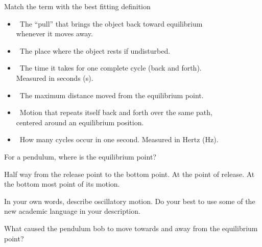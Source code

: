 \documentclass[]{exam}
\begin{document}
\begin{questions}
\question
Match the term with the best fitting definition

\begin{EnvUplevel}
\centering
{}%
\begin{minipage}{11.5cm}
\centering
\begin{itemize}
    \item[] \fillin[C][5mm]\ The ``pull'' that brings the object back toward equilibrium\\whenever it moves away.
    \item[] \fillin[B][5mm]\ The place where the object rests if undisturbed.
    \item[] \fillin[D][5mm]\ The time it takes for one complete cycle (back and forth).\\Measured in seconds (s).
    \item[] \fillin[F][5mm]\ The maximum distance moved from the equilibrium point.
    \item[] \fillin[A][5mm]\ Motion that repeats itself back and forth over the same path,\\centered around an equilibrium position.
    \item[] \fillin[E][5mm]\ How many cycles occur in one second. Measured in Hertz (Hz).
\end{itemize}
\end{minipage}
\end{EnvUplevel}



\question
For a pendulum, where is the equilibrium point?

\begin{randomizechoices}
    \choice Half way from the release point to the bottom point.
    \choice At the point of release.
    \correctchoice At the bottom most point of its motion.
\end{randomizechoices}

\question
In your own words, describe oscillatory motion. Do your best to use some of the new academic language in your description.

\question
What caused the pendulum bob to move towards and away from the equilibrium point?

\end{questions}
\end{document}
